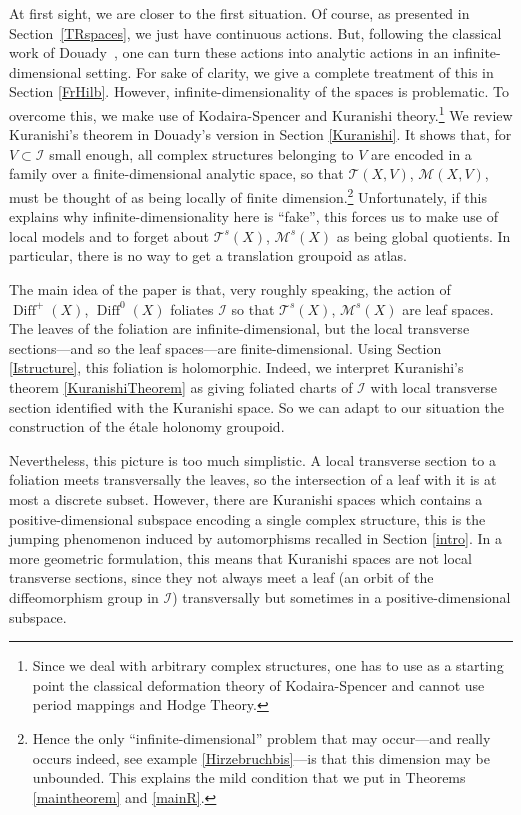 \documentclass[JEP,XML,SOM,Unicode]{cedram}
\let\mathcal\mathscr
\DeclareMathOperator{\Diff}{Diff}
\theoremstyle{plain}
\theoremstyle{definition}
\theoremstyle{remark}
\numberwithin{equation}{section}
\newcommand{\cI}{\mathcal{I}}
\begin{document}
At first sight, we are closer to the first situation. Of course, as presented in Section~\ref{TRspaces}, we just have continuous actions. But, following the classical work of Douady~\cite{Douady}, one can turn these actions into analytic actions in an infinite-dimensional setting. For sake of clarity, we give a complete treatment of this in Section \ref{FrHilb}. However, infinite-dimensionality of the spaces is problematic. To overcome this, we make use of Kodaira-Spencer and Kuranishi theory.\footnote{Since we deal with arbitrary complex structures, one has to use as a starting point the classical deformation theory of Kodaira-Spencer and cannot use period mappings and Hodge Theory.} We review Kuranishi's theorem in Douady's version in Section \ref{Kuranishi}. It shows that, for $V\subset \cI$ small enough, all complex structures belonging to $V$ are encoded in a family over a finite-dimensional analytic space, so that $\mathcal T(X,V)$, \resp $\mathcal M(X,V)$, must be thought of as being locally of finite dimension.\footnote{\label{noteinfdim}Hence the only ``infinite-dimensional'' problem that may occur---and really occurs indeed, see example \ref{Hirzebruchbis}---is that this dimension may be unbounded. This explains the mild condition that we put in Theorems \ref{maintheorem} and \ref{mainR}.} Unfortunately, if this explains why infinite-dimensionality here is ``fake'', this forces us to make use of local models and to forget about $\mathcal T^s(X)$, \resp $\mathcal M^s(X)$ as being global quotients. In particular, there is no way to get a translation groupoid as atlas.

The main idea of the paper is that, very roughly speaking, the action of $\Diff^+(X)$, \resp $\Diff^0(X)$ foliates $\cI$ so that $\mathcal T^s(X)$, \resp $\mathcal M^s(X)$ are leaf spaces. The leaves of the foliation are infinite-dimensional, but the local transverse sections---and so the leaf spaces---are finite-dimensional. Using Section \ref{Istructure}, this foliation is holomorphic. Indeed, we interpret Kuranishi's theorem \ref{KuranishiTheorem} as giving foliated charts of $\cI$ with local transverse section identified with the Kuranishi space. So we can adapt to our situation the construction of the étale holonomy groupoid.

Nevertheless, this picture is too much simplistic. A local transverse section to a foliation meets transversally the leaves, so the intersection of a leaf with it is at most a discrete subset. However, there are Kuranishi spaces which contains a positive-dimensional subspace encoding a single complex structure, this is the jumping phenomenon induced by automorphisms recalled in Section \ref{intro}. In a more geometric formulation, this means that Kuranishi spaces are not local transverse sections, since they not always meet a leaf (\ie an orbit of the diffeomorphism group in $\cI$) transversally but sometimes in a positive-dimensional subspace.
\end{document}
